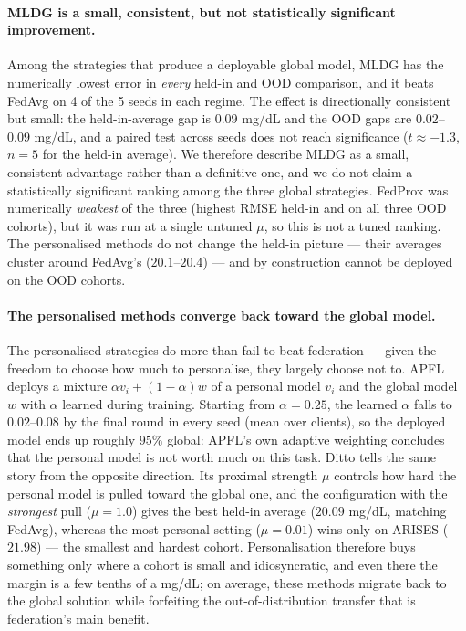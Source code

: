\documentclass[10pt,letterpaper]{article}
\begin{document}
\paragraph{MLDG is a small, consistent, but not statistically significant
improvement.} Among the strategies that produce a deployable global model, MLDG
has the numerically lowest error in \emph{every} held-in and OOD comparison, and
it beats FedAvg on 4 of the 5 seeds in each regime. The effect is directionally
consistent but small: the held-in-average gap is $0.09$ mg/dL and the OOD gaps
are $0.02$--$0.09$ mg/dL, and a paired test across seeds does not reach
significance ($t \approx -1.3$, $n=5$ for the held-in average). We therefore
describe MLDG as a small, consistent advantage rather than a definitive one, and
we do not claim a statistically significant ranking among the three global
strategies. FedProx was numerically \emph{weakest} of the three (highest RMSE
held-in and on all three OOD cohorts), but it was run at a single untuned $\mu$,
so this is not a tuned ranking. The personalised methods do not change the
held-in picture --- their averages cluster around FedAvg's ($20.1$--$20.4$) ---
and by construction cannot be deployed on the OOD cohorts.

\paragraph{The personalised methods converge back toward the global model.} The
personalised strategies do more than fail to beat federation --- given the freedom
to choose how much to personalise, they largely choose not to. APFL deploys a
mixture $\alpha v_i + (1-\alpha) w$ of a personal model $v_i$ and the global model
$w$ with $\alpha$ learned during training. Starting from $\alpha = 0.25$, the
learned $\alpha$ falls to $0.02$--$0.08$ by the final round in every seed
(mean over clients), so the deployed model ends up roughly $95\%$ global: APFL's
own adaptive weighting concludes that the personal model is not worth much on this
task. Ditto tells the same story from the opposite direction. Its proximal
strength $\mu$ controls how hard the personal model is pulled toward the global
one, and the configuration with the \emph{strongest} pull ($\mu = 1.0$) gives the
best held-in average ($20.09$ mg/dL, matching FedAvg), whereas the most personal
setting ($\mu = 0.01$) wins only on ARISES ($21.98$) --- the smallest and hardest
cohort. Personalisation therefore buys something only where a cohort is small and
idiosyncratic, and even there the margin is a few tenths of a mg/dL; on average,
these methods migrate back to the global solution while forfeiting the
out-of-distribution transfer that is federation's main benefit.
\end{document}
